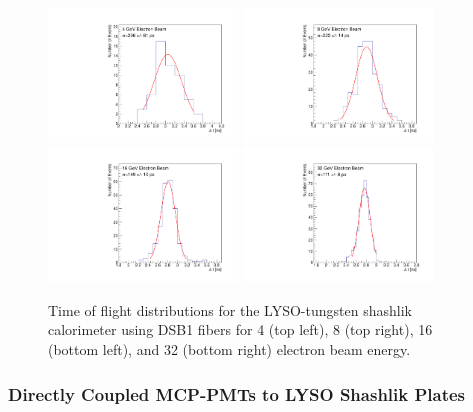 \begin{figure}[H] \centering
\includegraphics[width=0.45\textwidth]{figs/timing/TOF_ShashlikDSB1Fiber_Electron_4GeV} 
\includegraphics[width=0.45\textwidth]{figs/timing/TOF_ShashlikDSB1Fiber_Electron_8GeV} \\
\includegraphics[width=0.45\textwidth]{figs/timing/TOF_ShashlikDSB1Fiber_Electron_16GeV} 
\includegraphics[width=0.45\textwidth]{figs/timing/TOF_ShashlikDSB1Fiber_Electron_32GeV} 
\caption{Time of flight distributions for the LYSO-tungsten shashlik calorimeter
using DSB1 fibers for 4 \GeV (top left), 8 \GeV (top right), 16 \GeV (bottom left), and 32 \GeV (bottom right) electron beam energy.} 
\label{fig:ShashlikFiberTOF}
\end{figure}


\subsubsection{Directly Coupled MCP-PMTs to LYSO Shashlik Plates}

